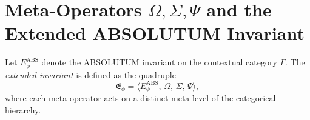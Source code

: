 
\section{Meta-Operators \texorpdfstring{$\Omega,\Sigma,\Psi$}{Ω,Σ,Ψ} and the Extended ABSOLUTUM Invariant}
\label{sec:vol2-part6-meta-operators}\relax\hspace{0pt}

\begin{definition}\label{def:extended-invariant}
Let $E_{\phi}^{\mathrm{ABS}}$ denote the ABSOLUTUM invariant on the contextual category $\Gamma$.
The \emph{extended invariant} is defined as the quadruple
\[
\mathfrak{E}_{\phi}
=\langle
E_{\phi}^{\mathrm{ABS}},\,
\Omega,\,
\Sigma,\,
\Psi
\rangle,
\]
where each meta-operator acts on a distinct meta-level of the categorical hierarchy.
\end{definition}


